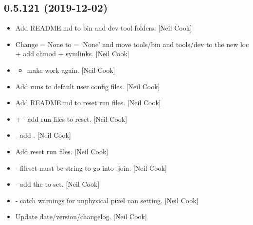 \documentclass[a4paper,10pt,english]{report}
\begin{document}
\subsection{0.5.121 (2019-12-02)}
\label{\detokenize{misc/changelog:id21}}\begin{itemize}
\item {} 
Add README.md to bin and dev tool folders. {[}Neil Cook{]}

\item {} 
Change  = None to  = ‘None’ and move
tools/bin and tools/dev to the new loc + add chmod + symlinks. {[}Neil
Cook{]}

\item {} \begin{itemize}
\item {} 
make  work again. {[}Neil Cook{]}

\end{itemize}

\item {} 
Add runs to default user config files. {[}Neil Cook{]}

\item {} 
Add README.md to reset run files. {[}Neil Cook{]}

\item {} 
 +  - add run files to reset. {[}Neil
Cook{]}

\item {} 
 - add . {[}Neil
Cook{]}

\item {} 
Add reset run files. {[}Neil Cook{]}

\item {} 
 - fileset must be string to go
into .join. {[}Neil Cook{]}

\item {} 
 - add the  to
 set. {[}Neil Cook{]}

\item {} 
 - catch warnings for unphysical pixel nan
setting. {[}Neil Cook{]}

\item {} 
Update date/version/changelog. {[}Neil Cook{]}

\end{itemize}
\end{document}
